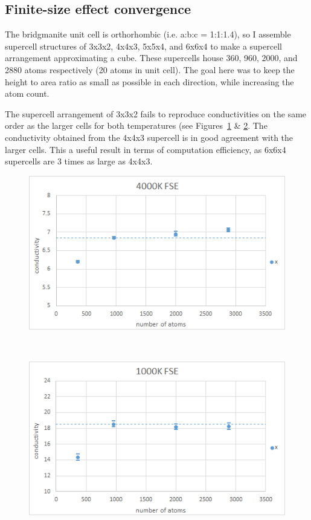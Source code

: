 \pagebreak


\subsection{\label{sec:3.GK.fse}Finite-size effect convergence}

The bridgmanite unit cell is orthorhombic (i.e. a:b:c = 1:1:1.4), so I assemble supercell structures of 3x3x2, 4x4x3, 5x5x4, and 6x6x4 to make a supercell arrangement approximating a cube. These supercells house 360, 960, 2000, and 2880 atoms respectively (20 atoms in unit cell). The goal here was to keep the height to area ratio as small as possible in each direction, while increasing the atom count.

The supercell arrangement of 3x3x2 fails to reproduce conductivities on the same order as the larger cells for both temperatures (see Figures~\ref{fig:gk_fse_4K} \& \ref{fig:gk_fse_1K}. The conductivity obtained from the 4x4x3 supercell is in good agreement with the larger cells. This a useful result in terms of computation efficiency, as 6x6x4 supercells are 3 times as large as 4x4x3.

\begin{figure}[hb]
\includegraphics[width=\linewidth]{Figures/gk_fse_4K_draft.png}
\caption[gk fse 4k]{}
\label{fig:gk_fse_4K}
\end{figure}
~
\begin{figure}[h]
\includegraphics[width=\linewidth]{Figures/gk_fse_1K_draft.png}
\caption[gk fse 1k]{}
\label{fig:gk_fse_1K}
\end{figure}


